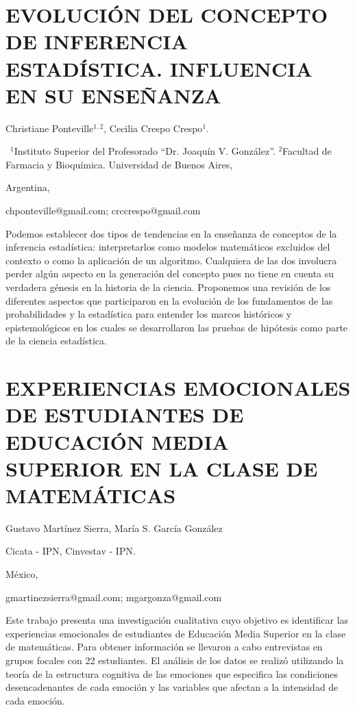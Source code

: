 \section{EVOLUCIÓN DEL CONCEPTO DE INFERENCIA ESTADÍSTICA. INFLUENCIA EN SU
ENSEÑANZA}

\begin{datos}

Christiane Ponteville$^{1,2}$, Cecilia Crespo Crespo$^{1}$.

 $^{1}$Instituto Superior del Profesorado “Dr. Joaquín V. González”.
$^{2}$Facultad de Farmacia y Bioquímica. Universidad de Buenos Aires,

Argentina,

chponteville@gmail.com; crccrespo@gmail.com

\end{datos}

Podemos establecer dos tipos de tendencias en la enseñanza de conceptos
de la inferencia estadística: interpretarlos como modelos matemáticos
excluidos del contexto o como la aplicación de un algoritmo. Cualquiera
de las dos involucra perder algún aspecto en la generación del concepto
pues no tiene en cuenta su verdadera génesis en la historia de la
ciencia. Proponemos una revisión de los diferentes aspectos que participaron
en la evolución de los fundamentos de las probabilidades y la estadística
para entender los marcos históricos y epistemológicos en los cuales
se desarrollaron las pruebas de hipótesis como parte de la ciencia
estadística.


\section{EXPERIENCIAS EMOCIONALES DE ESTUDIANTES DE EDUCACIÓN MEDIA SUPERIOR
EN LA CLASE DE MATEMÁTICAS}

\begin{datos}

Gustavo Martínez Sierra, María S. García González

Cicata - IPN, Cinvestav - IPN.

México,

gmartinezsierra@gmail.com; mgargonza@gmail.com 

\end{datos}

Este trabajo presenta una investigación cualitativa cuyo objetivo
es identificar las experiencias emocionales de estudiantes de Educación
Media Superior en la clase de matemáticas. Para obtener información
se llevaron a cabo entrevistas en grupos focales con 22 estudiantes.
El análisis de los datos se realizó utilizando la teoría de la estructura
cognitiva de las emociones que especifica las condiciones desencadenantes
de cada emoción y las variables que afectan a la intensidad de cada
emoción.


